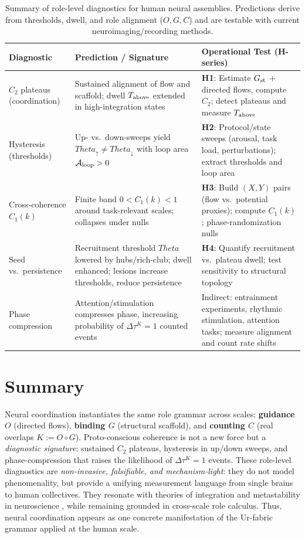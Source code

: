 \documentclass[12pt,a4paper,oneside]{scrreprt}
\def\Theta{Theta}%
\begin{document}
\begin{table}[h!]
\centering
\renewcommand{\arraystretch}{1.3}
\begin{tabular}{|p{3.5cm}|p{4.5cm}|p{4.5cm}|}
\hline
\textbf{Diagnostic} & \textbf{Prediction / Signature} & \textbf{Operational Test (H-series)} \\
\hline
$C_2$ plateaus (coordination) & Sustained alignment of flow and scaffold; dwell $T_{\rm above}$ extended in high-integration states & \textbf{H1}: Estimate $G_{\rm st}$ + directed flows, compute $C_2$; detect plateaus and measure $T_{\rm above}$ \\
\hline
Hysteresis (thresholds) & Up- vs.\ down-sweeps yield $\Theta_\uparrow \neq \Theta_\downarrow$ with loop area $\mathcal A_{\rm loop}>0$ & \textbf{H2}: Protocol/state sweeps (arousal, task load, perturbations); extract thresholds and loop area \\
\hline
Cross-coherence $C_1(k)$ & Finite band $0<C_1(k)<1$ around task-relevant scales; collapses under nulls & \textbf{H3}: Build $(X,Y)$ pairs (flow vs.\ potential proxies); compute $C_1(k)$; phase-randomization nulls \\
\hline
Seed vs.\ persistence & Recruitment threshold $\Theta$ lowered by hubs/rich-club; dwell enhanced; lesions increase thresholds, reduce persistence & \textbf{H4}: Quantify recruitment vs.\ plateau dwell; test sensitivity to structural topology \\
\hline
Phase compression & Attention/stimulation compresses phase, increasing probability of $\Delta\tau^K=1$ counted events & Indirect: entrainment experiments, rhythmic stimulation, attention tasks; measure alignment and count rate shifts \\
\hline
\end{tabular}
\caption{Summary of role-level diagnostics for human neural assemblies. Predictions derive from thresholds, dwell, and role alignment ($O,G,C$) and are testable with current neuroimaging/recording methods.}
\label{tab:human-neural-summary}
\end{table}

\section*{Summary}
Neural coordination instantiates the same role grammar across scales: 
\textbf{guidance $O$} (directed flows), 
\textbf{binding $G$} (structural scaffold), 
and \textbf{counting $C$} (real overlaps $K:=O\!\circ G$). 
Proto-conscious coherence is not a new force but a \emph{diagnostic signature}: 
sustained $C_2$ plateaus, hysteresis in up/down sweeps, and phase-compression that raises the likelihood of $\Delta\tau^K=1$ events. 
These role-level diagnostics are \emph{non-invasive, falsifiable, and mechanism-light}: they do not model phenomenality, but provide a unifying measurement language from single brains to human collectives. 
They resonate with theories of integration and metastability in neuroscience \citep{friston2016predictive,tononi2016integrated,dehaene2017consciousness}, while remaining grounded in cross-scale role calculus. 
Thus, neural coordination appears as one concrete manifestation of the Ur-fabric grammar applied at the human scale.
\end{document}
